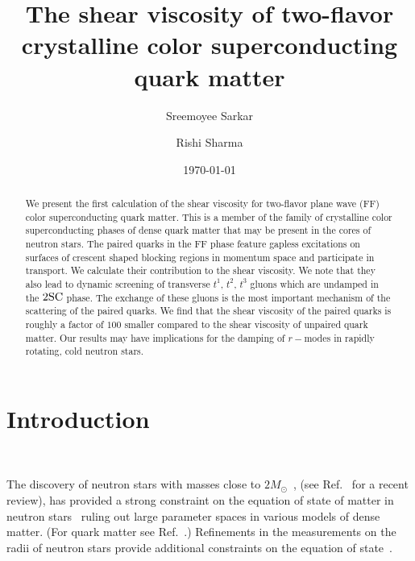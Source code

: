\documentclass[10pt, aps, prd, superscriptaddress, nofootinbib, 
               amsmath, amssymb, twocolumn,
               preprintnumbers, showpacs,
               raggedbottom,
               floatfix]{revtex4-1}
\newcommand{\SC}{{\rm{SC}}}
\begin{document}
\title{The shear viscosity of two-flavor crystalline color superconducting
quark matter}
\author{Sreemoyee Sarkar}
\author{Rishi Sharma}

\date{\today}

\begin{abstract}
\noindent
We present the first calculation of the shear viscosity for two-flavor plane wave
(FF) color superconducting quark matter. This is a member of the family of
crystalline color superconducting phases of dense quark matter that may be
present in the cores of neutron stars. The paired quarks in the FF phase
feature gapless excitations on surfaces of crescent shaped blocking regions in
momentum space and participate in transport. We
calculate their contribution to the shear viscosity. We note that they also
lead to dynamic screening of transverse $t^1$, $t^2$, $t^3$ gluons which are
undamped in the $2\SC$ phase. The exchange of these gluons is the most
important mechanism of the scattering of the paired quarks. We find that the
shear viscosity of the paired quarks is roughly a factor of $100$ smaller
compared to the shear viscosity of unpaired quark matter. Our results may have
implications for the damping of $r-$modes in rapidly rotating, cold neutron
stars.
\end{abstract}

\maketitle
\tableofcontents
\section{Introduction}
~\label{sec:introduction}

The discovery of neutron stars with masses close to
$2M_\odot$~\cite{Demorest:2010bx,Antoniadis:2013pzd}, (see
Ref.~\cite{Ozel:2016oaf} for a recent review), has provided a strong constraint
on the equation of state of matter in neutron
stars~\cite{page2006dense,Ozel:2010bz,Potekhin:2010,Lattimer:2012nd,Prakash:2014tva}
ruling out large parameter spaces in various models of dense matter.  (For
quark matter see Ref.~\cite{Ranea-Sandoval:2015ldr}.) Refinements in the
measurements on the radii of neutron stars provide additional constraints on
the equation of state~\cite{Steiner:2012xt,Lattimer:2013hma}. 
\end{document}
